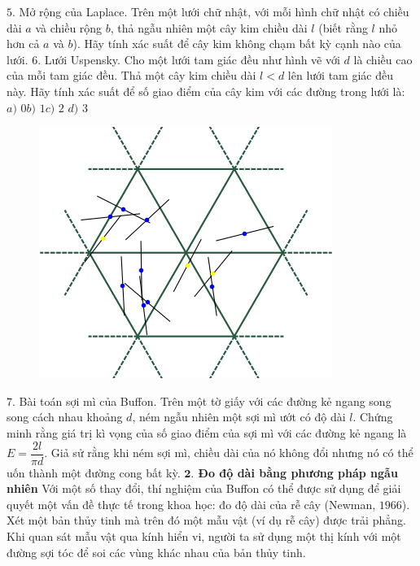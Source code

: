 \begin{multicols}{2}
	\vskip 0.1cm
	$5$. Mở rộng của Laplace. Trên một lưới chữ nhật, với mỗi hình chữ nhật có chiều dài $a$ và chiều rộng $b$, thả ngẫu nhiên một cây kim chiều dài $l$ (biết rằng $l$ nhỏ hơn cả $a$ và $b$). Hãy tính xác suất để cây kim không chạm bất kỳ cạnh nào của lưới.
	\vskip 0.1cm
	$6$. Lưới Uspensky. Cho một lưới tam giác đều như hình vẽ với $d$ là chiều cao của mỗi tam giác đều. Thả một cây kim chiều dài \linebreak$l<d$ lên lưới tam giác đều này. Hãy tính xác suất để số giao điểm của cây kim với các đường trong lưới là:
	\vskip 0.1cm
	\quad\quad$a)$ $0$\quad\quad		$b)$ $1$\quad\quad		$c)$ $2$	\quad\quad	$d)$ $3$
	\begin{figure}[H]
		\vspace*{5pt}
		\centering
		\captionsetup{labelformat= empty, justification=centering}
		\includegraphics[width=1\linewidth]{6}
		\vspace*{-15pt}
	\end{figure}
	$7$. Bài toán sợi mì của Buffon. Trên một tờ giấy với các đường kẻ ngang song song cách nhau khoảng $d$, ném ngẫu nhiên một sợi mì ướt có độ dài $l$. Chứng minh rằng giá trị kì vọng của số giao điểm của sợi mì với các đường kẻ ngang là $E=\dfrac{2l}{\pi d}$. Giả sử rằng khi ném sợi mì, chiều dài của nó không đổi nhưng nó có thể uốn thành một đường cong bất kỳ.
	\vskip 0.1cm
	\textbf{\color{toanhocdoisong}$\pmb{2.}$ Đo độ dài bằng phương pháp ngẫu nhiên}
	\vskip 0.1cm
	Với một số thay đổi, thí nghiệm của Buffon có thể được sử dụng để giải quyết một vấn đề thực tế trong khoa học: đo độ dài của rễ cây (Newman, $1966$). Xét một bản thủy tinh mà trên đó một mẫu vật (ví dụ rễ cây) được trải phẳng. Khi quan sát mẫu vật qua kính hiển vi, người ta sử dụng một thị kính với một đường sợi tóc để soi các vùng khác nhau của bản thủy tinh.

\end{multicols}
